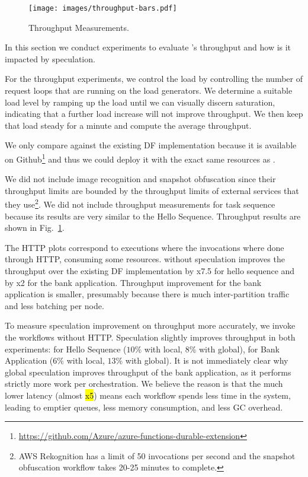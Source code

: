 \begin{figure}[t]
    \centering
    \texttt{[image: images/throughput-bars.pdf]}
    \caption{Throughput Measurements. \str
    }
    \label{fig:throughputs}
\end{figure}

In this section we conduct experiments to evaluate \sys's throughput and how is it impacted by speculation.

For the throughput experiments, we control the load by controlling the number of request loops that are running on the load generators. We determine a suitable load level by ramping up the load until we can visually discern saturation, indicating that a further load increase will not improve throughput. We then keep that load steady for a minute and compute the average throughput.

We only compare against the existing DF implementation because it is available on Github\footnote{\url{https://github.com/Azure/azure-functions-durable-extension}} and thus we could deploy it with the exact same resources as \sys.

We did not include image recognition and snapshot obfuscation since their throughput limits are bounded by the throughput limits of external services that they use\footnote{AWS Rekognition has a limit of 50 invocations per second and the snapshot obfuscation workflow takes 20-25 minutes to complete.}. We did not include throughput measurements for task sequence because its results are very similar to the Hello Sequence. Throughput results are shown in Fig.~\ref{fig:throughputs}.

%
The HTTP plots correspond to executions where the invocations where done through HTTP, consuming some resources.
\sys without speculation improves the throughput over the existing DF implementation by x7.5 for hello sequence and by x2 for the bank application.
Throughput improvement for the bank application is smaller, presumably because there is much inter-partition traffic and less batching per node.

%
To measure speculation improvement on throughput more accurately, we invoke the workflows without HTTP. Speculation slightly improves throughput in both experiments: for Hello Sequence ($10\%$ with local, $8\%$ with global), for Bank Application ($6\%$ with local, $13\%$ with global). It is not immediately clear why global speculation improves throughput of the bank application, as it performs strictly more work per orchestration. We believe the reason is that the much lower latency (almost \hl{x5}) means each workflow spends less time in the system, leading to emptier queues, less memory consumption, and less GC overhead.

